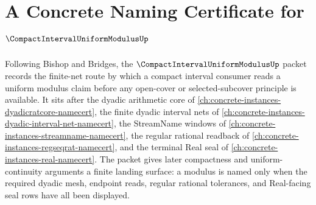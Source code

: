 \chapter{A Concrete Naming Certificate for $\CompactIntervalUniformModulusUp$}
\label{ch:concrete-instances-compact-interval-uniform-modulus-namecert}

Following Bishop and Bridges, the $\CompactIntervalUniformModulusUp$ packet records the finite-net route by which a compact interval consumer reads a uniform modulus claim before any open-cover or selected-subcover principle is available. It sits after the dyadic arithmetic core of \autoref{ch:concrete-instances-dyadicratcore-namecert}, the finite dyadic interval nets of \autoref{ch:concrete-instances-dyadic-interval-net-namecert}, the StreamName windows of \autoref{ch:concrete-instances-streamname-namecert}, the regular rational readback of \autoref{ch:concrete-instances-regseqrat-namecert}, and the terminal Real seal of \autoref{ch:concrete-instances-real-namecert}. The packet gives later compactness and uniform-continuity arguments a finite landing surface: a modulus is named only when the required dyadic mesh, endpoint reads, regular rational tolerances, and Real-facing seal rows have all been displayed.

